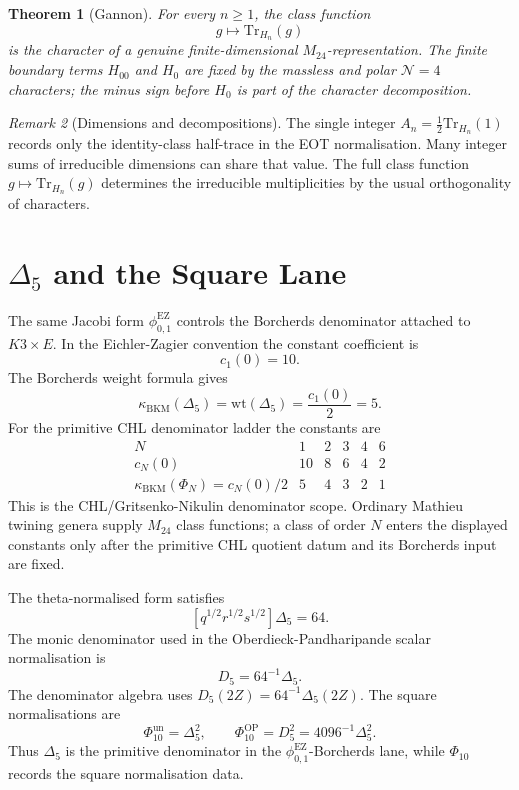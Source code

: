 \documentclass[11pt]{article}
\newtheorem{theorem}{Theorem}
\theoremstyle{definition}
\theoremstyle{remark}
\newtheorem{remark}[theorem]{Remark}
\newcommand{\Tr}{\mathrm{Tr}}
\newcommand{\phiEZ}{\phi_{0,1}^{\mathrm{EZ}}}
\begin{document}
\begin{theorem}[Gannon]
\label{thm:gannon}
For every \(n\geq 1\), the class function
\[
  g\longmapsto \Tr_{H_n}(g)
\]
is the character of a genuine finite-dimensional \(M_{24}\)-representation.
The finite boundary terms \(H_{00}\) and \(H_0\) are fixed by the
massless and polar \(\mathcal N=4\) characters; the minus sign before
\(H_0\) is part of the character decomposition.
\end{theorem}

\begin{remark}[Dimensions and decompositions]
\label{rem:dimension-vs-character}
The single integer \(A_n=\frac12\Tr_{H_n}(1)\) records only the
identity-class half-trace in the EOT normalisation.  Many integer sums
of irreducible dimensions can share that value.  The full class
function \(g\mapsto \Tr_{H_n}(g)\) determines the irreducible
multiplicities by the usual orthogonality of characters.
\end{remark}

\section{\texorpdfstring{$\Delta_5$}{Delta5} and the Square Lane}
\label{sec:delta5}

The same Jacobi form \(\phiEZ\) controls the Borcherds denominator
attached to \(K3\times E\).  In the Eichler-Zagier convention the
constant coefficient is
\[
  c_1(0)=10.
\]
The Borcherds weight formula gives
\begin{equation}
\label{eq:bkm-weight-delta5-polyakov}
  \kappa_{\mathrm{BKM}}(\Delta_5)
  =
  \mathrm{wt}(\Delta_5)
  =
  \frac{c_1(0)}{2}
  =
  5.
\end{equation}
For the primitive CHL denominator ladder the constants are
\[
\begin{array}{c|ccccc}
N&1&2&3&4&6\\
\hline
c_N(0)&10&8&6&4&2\\
\kappa_{\mathrm{BKM}}(\Phi_N)=c_N(0)/2&5&4&3&2&1
\end{array}
\]
This is the CHL/Gritsenko-Nikulin denominator scope.  Ordinary
Mathieu twining genera supply \(M_{24}\) class functions; a class of
order \(N\) enters the displayed constants only after the primitive CHL
quotient datum and its Borcherds input are fixed.

The theta-normalised form satisfies
\[
  [q^{1/2}r^{1/2}s^{1/2}]\Delta_5=64.
\]
The monic denominator used in the Oberdieck-Pandharipande scalar
normalisation is
\begin{equation}
\label{eq:D5-normalisation}
  D_5=64^{-1}\Delta_5.
\end{equation}
The denominator algebra uses \(D_5(2Z)=64^{-1}\Delta_5(2Z)\).
The square normalisations are
\[
  \Phi_{10}^{\mathrm{un}}=\Delta_5^2,
  \qquad
  \Phi_{10}^{\mathrm{OP}}=D_5^2=4096^{-1}\Delta_5^2.
\]
Thus \(\Delta_5\) is the primitive denominator in the
\(\phiEZ\)-Borcherds lane, while \(\Phi_{10}\) records the square
normalisation data.
\end{document}
